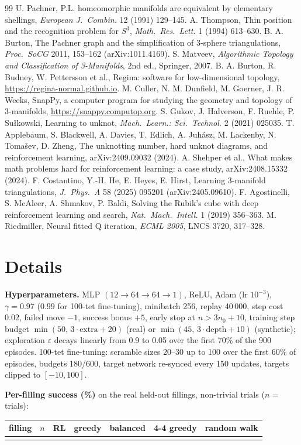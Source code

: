 \documentclass[10pt,a4paper]{article}
\newcommand{\eps}{\varepsilon}
\begin{document}
\clearpage
\begin{thebibliography}{99}\small\setlength{\itemsep}{0pt}
 U. Pachner, P.L. homeomorphic manifolds are equivalent by elementary shellings, \emph{European J.\ Combin.} 12 (1991) 129--145.
 A. Thompson, Thin position and the recognition problem for $S^3$, \emph{Math.\ Res.\ Lett.} 1 (1994) 613--630.
 B. A. Burton, The Pachner graph and the simplification of 3-sphere triangulations, \emph{Proc.\ SoCG} 2011, 153--162 (arXiv:1011.4169).
 S. Matveev, \emph{Algorithmic Topology and Classification of 3-Manifolds}, 2nd ed., Springer, 2007.
 B. A. Burton, R. Budney, W. Pettersson et al., Regina: software for low-dimensional topology, \url{https://regina-normal.github.io}.
 M. Culler, N. M. Dunfield, M. Goerner, J. R. Weeks, SnapPy, a computer program for studying the geometry and topology of 3-manifolds, \url{https://snappy.computop.org}.
 S. Gukov, J. Halverson, F. Ruehle, P. Sułkowski, Learning to unknot, \emph{Mach.\ Learn.: Sci.\ Technol.} 2 (2021) 025035.
 T. Applebaum, S. Blackwell, A. Davies, T. Edlich, A. Juh\'asz, M. Lackenby, N. Tomašev, D. Zheng, The unknotting number, hard unknot diagrams, and reinforcement learning, arXiv:2409.09032 (2024).
 A. Shehper et al., What makes math problems hard for reinforcement learning: a case study, arXiv:2408.15332 (2024).
 F. Costantino, Y.-H. He, E. Heyes, E. Hirst, Learning 3-manifold triangulations, \emph{J.\ Phys.\ A} 58 (2025) 095201 (arXiv:2405.09610).
 F. Agostinelli, S. McAleer, A. Shmakov, P. Baldi, Solving the Rubik's cube with deep reinforcement learning and search, \emph{Nat.\ Mach.\ Intell.} 1 (2019) 356--363.
 M. Riedmiller, Neural fitted Q iteration, \emph{ECML 2005}, LNCS 3720, 317--328.
\end{thebibliography}

\appendix
\section{Details}\label{app:inst}
\textbf{Hyperparameters.} MLP $(12\to64\to64\to1)$, ReLU, Adam (lr $10^{-3}$), $\gamma=0.97$ ($0.99$ for 100-tet fine-tuning), minibatch 256, replay 40\,000, step cost $0.02$, failed move $-1$, success bonus $+5$, early stop at $n>3n_0+10$, training step budget $\min(50,\,3\cdot\text{extra}+20)$ (real) or $\min(45,\,3\cdot\text{depth}+10)$ (synthetic); exploration $\eps$ decays linearly from 0.9 to 0.05 over the first 70\% of the 900 episodes. 100-tet fine-tuning: scramble sizes 20--30 up to 100 over the first 60\% of episodes, budgets 180/600, target network re-synced every 150 updates, targets clipped to $[-10,100]$.

\textbf{Per-filling success (\%)} on the real held-out fillings, non-trivial trials ($n$ = trials):
\begin{center}\small
\begin{tabular}{@{}lcccccc@{}}\toprule
filling & $n$ & RL & greedy & balanced & 4-4 greedy & random walk\\\midrule
\\
\bottomrule\end{tabular}
\end{center}
\end{document}
